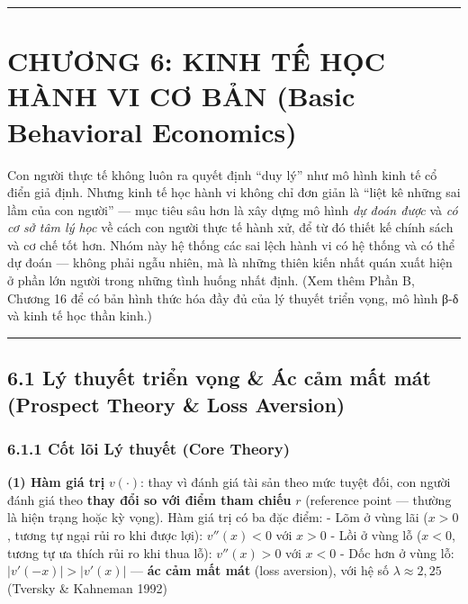 \documentclass[
]{article}
\begin{document}
\begin{center}\rule{0.5\linewidth}{0.5pt}\end{center}

\section{CHƯƠNG 6: KINH TẾ HỌC HÀNH VI CƠ BẢN (Basic Behavioral
Economics)}\label{chux1b0ux1a1ng-6-kinh-tux1ebf-hux1ecdc-huxe0nh-vi-cux1a1-bux1ea3n-basic-behavioral-economics}

Con người thực tế không luôn ra quyết định ``duy lý'' như mô hình kinh
tế cổ điển giả định. Nhưng kinh tế học hành vi không chỉ đơn giản là
``liệt kê những sai lầm của con người'' --- mục tiêu sâu hơn là xây dựng
mô hình \emph{dự đoán được} và \emph{có cơ sở tâm lý học} về cách con
người thực tế hành xử, để từ đó thiết kế chính sách và cơ chế tốt hơn.
Nhóm này hệ thống các sai lệch hành vi có hệ thống và có thể dự đoán ---
không phải ngẫu nhiên, mà là những thiên kiến nhất quán xuất hiện ở phần
lớn người trong những tình huống nhất định. (Xem thêm Phần B, Chương 16
để có bản hình thức hóa đầy đủ của lý thuyết triển vọng, mô hình β-δ và
kinh tế học thần kinh.)

\begin{center}\rule{0.5\linewidth}{0.5pt}\end{center}

\subsection{6.1 Lý thuyết triển vọng \& Ác cảm mất mát (Prospect Theory
\& Loss
Aversion)}\label{luxfd-thuyux1ebft-triux1ec3n-vux1ecdng-uxe1c-cux1ea3m-mux1ea5t-muxe1t-prospect-theory-loss-aversion}

\subsubsection{6.1.1 Cốt lõi Lý thuyết (Core
Theory)}\label{cux1ed1t-luxf5i-luxfd-thuyux1ebft-core-theory-8}

\textbf{(1) Hàm giá trị} \(v(\cdot)\): thay vì đánh giá tài sản theo mức
tuyệt đối, con người đánh giá theo \textbf{thay đổi so với điểm tham
chiếu} \(r\) (reference point --- thường là hiện trạng hoặc kỳ vọng).
Hàm giá trị có ba đặc điểm: - Lõm ở vùng lãi (\(x > 0\), tương tự ngại
rủi ro khi được lợi): \(v''(x) < 0\) với \(x > 0\) - Lồi ở vùng lỗ
(\(x < 0\), tương tự ưa thích rủi ro khi thua lỗ): \(v''(x) > 0\) với
\(x < 0\) - Dốc hơn ở vùng lỗ: \(|v'(-x)| > |v'(x)|\) --- \textbf{ác cảm
mất mát} (loss aversion), với hệ số \(\lambda \approx 2{,}25\) (Tversky
\& Kahneman 1992)
\end{document}
